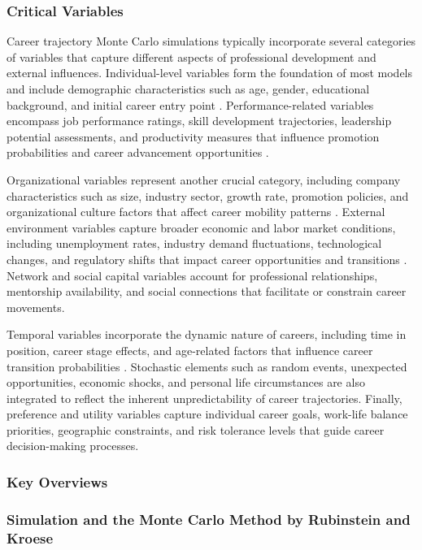 \documentclass[main.tex]{subfiles}
\begin{document}
\subsubsection{Critical Variables}

Career trajectory Monte Carlo simulations typically incorporate several categories of variables that capture different aspects of professional development and external influences. Individual-level variables form the foundation of most models and include demographic characteristics such as age, gender, educational background, and initial career entry point \parencite{petersen2012}. Performance-related variables encompass job performance ratings, skill development trajectories, leadership potential assessments, and productivity measures that influence promotion probabilities and career advancement opportunities \parencite{guo2022nature}.

Organizational variables represent another crucial category, including company characteristics such as size, industry sector, growth rate, promotion policies, and organizational culture factors that affect career mobility patterns \parencite{guo2022nature}. External environment variables capture broader economic and labor market conditions, including unemployment rates, industry demand fluctuations, technological changes, and regulatory shifts that impact career opportunities and transitions \parencite{sciencedirect2024}. Network and social capital variables account for professional relationships, mentorship availability, and social connections that facilitate or constrain career movements.

Temporal variables incorporate the dynamic nature of careers, including time in position, career stage effects, and age-related factors that influence career transition probabilities \parencite{petersen2012}. Stochastic elements such as random events, unexpected opportunities, economic shocks, and personal life circumstances are also integrated to reflect the inherent unpredictability of career trajectories. Finally, preference and utility variables capture individual career goals, work-life balance priorities, geographic constraints, and risk tolerance levels that guide career decision-making processes.

\subsubsection{Key Overviews}

\subsubsection{Simulation and the Monte Carlo Method by Rubinstein and Kroese}
\end{document}
